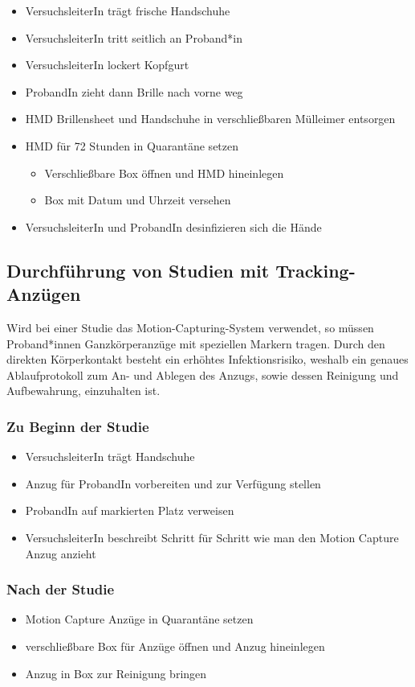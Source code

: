 {
\singlespacing
\begin{itemize}
    \item VersuchsleiterIn trägt frische Handschuhe
    \item VersuchsleiterIn tritt seitlich an Proband*in
    \item VersuchsleiterIn lockert Kopfgurt
    \item ProbandIn zieht dann Brille nach vorne weg
    \item HMD Brillensheet und Handschuhe in verschließbaren Mülleimer entsorgen
    \item HMD für 72 Stunden in Quarantäne setzen
    \begin{itemize}
        \item Verschließbare Box öffnen und HMD hineinlegen
        \item Box mit Datum und Uhrzeit versehen
    \end{itemize}
    \item VersuchsleiterIn und ProbandIn desinfizieren sich die Hände
\end{itemize}
}

\subsection{Durchführung von Studien mit Tracking-Anzügen}\label{subsec:nutzerstudien_mocap}

Wird bei einer Studie das Motion-Capturing-System verwendet, so müssen Proband*innen Ganzkörperanzüge mit speziellen Markern tragen.
Durch den direkten Körperkontakt besteht ein erhöhtes Infektionsrisiko, weshalb ein genaues Ablaufprotokoll zum An- und Ablegen des Anzugs, sowie dessen Reinigung und Aufbewahrung, einzuhalten ist.

\subsubsection*{Zu Beginn der Studie}

{
\singlespacing
\begin{itemize}
    \item VersuchsleiterIn trägt Handschuhe
    \item Anzug für ProbandIn vorbereiten und zur Verfügung stellen
    \item ProbandIn auf markierten Platz verweisen 
    \item VersuchsleiterIn beschreibt Schritt für Schritt wie man den Motion Capture Anzug anzieht
\end{itemize}
}

\subsubsection*{Nach der Studie}

{
\singlespacing
\begin{itemize}
    \item Motion Capture Anzüge in Quarantäne setzen
    \item verschließbare Box für Anzüge öffnen und Anzug hineinlegen
    \item Anzug in Box zur Reinigung bringen
\end{itemize}
}
